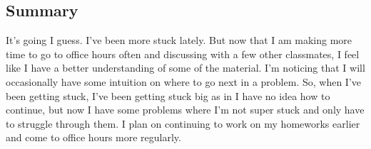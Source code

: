 \documentclass[12pt]{article}
\begin{document}
\begin{enumerate}
		\section*{Summary}
		It's going I guess. I've been more stuck lately. But now that I am making more time to go to office hours often and discussing with a few other classmates, I feel like I have a better understanding of some of the material. I'm noticing that I will occasionally have some intuition on where to go next in a problem. So, when I've been getting stuck, I've been getting stuck big as in I have no idea how to continue, but now I have some problems where I'm not super stuck and only have to struggle through them. I plan on continuing to work on my homeworks earlier and come to office hours more regularly.
	\end{enumerate}
	
\end{document}
